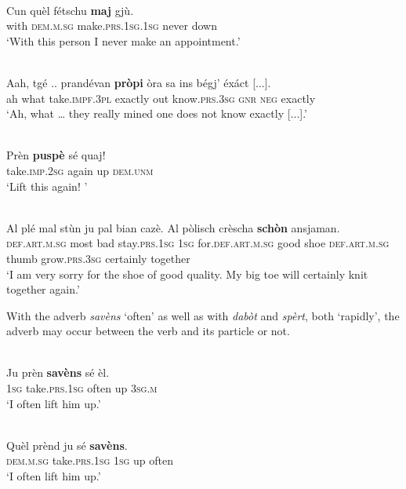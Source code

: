 \ea
\label{ex:pv:6}
\\
\gll  Cun quèl fétschu \textbf{maj} gjù.  \\
with \textsc{dem.m.sg} make.\textsc{prs.1sg}.\textsc{1sg} never down\\
\glt `With this person I never make an appointment.'
\z

\ea
\label{ex:pv:7}
\\
\gll   Aah, tgé .. prandévan \textbf{pròpi} òra sa ins bégj' éxáct [...]. \\
ah what {} take.\textsc{impf.3pl} exactly out know.\textsc{prs.3sg} \textsc{gnr} \textsc{neg} exactly\\
\glt `Ah, what … they really mined one does not know exactly [...].'
\z

\ea
\label{ex:pv:8}
\\
\gll  Prèn \textbf{puspè} sé quaj! \\
take.\textsc{imp.2sg} again up \textsc{dem.unm}  \\
\glt `Lift this again! '
\z

\ea
\label{ex:pv:9}
 {\citealt[51]{Berther1998}}\\
\gll  Al plé mal stùn ju pal bian cazè. Al pòlisch crèscha \textbf{schòn} ansjaman.\\
     \textsc{def.art.m.sg}  most bad stay.\textsc{prs.1sg}  \textsc{1sg} for.\textsc{def.art.m.sg} good shoe \textsc{def.art.m.sg} thumb grow.\textsc{prs.3sg}  certainly together\\
\glt `I am very sorry for the shoe of good quality. My big toe will certainly knit together again.'
\z

With the adverb \textit{savèns} `often' as well as with \textit{dabòt} and \textit{spèrt}, both `rapidly', the adverb may occur between the verb and its particle or not.

\ea
\label{ex:pv:10}
\\
\gll    Ju prèn \textbf{savèns} sé èl.\\
     \textsc{1sg} take.\textsc{prs.1sg} often up \textsc{3sg.m}\\
\glt `I often lift him up.'
\z

\ea
\label{ex:pv:11}
\\
\gll    Quèl prènd ju sé \textbf{savèns}.\\
     \textsc{dem.m.sg} take.\textsc{prs.1sg} \textsc{1sg} up often\\
\glt `I often lift him up.'
\z

